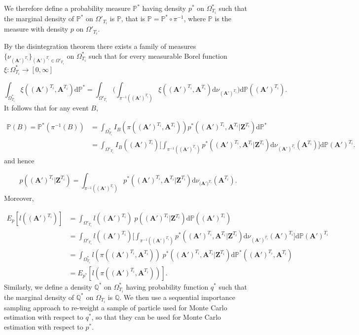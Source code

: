 \documentclass{article}
\newcommand{\D}{\mathrm{d}}
\renewcommand{\vec}[1]{\mathbf{#1}}
\begin{document}
We therefore define a probability measure $\mathbb{P}^*$ having density $p^*$ on $\Omega^*_{T_i}$ such that the marginal density of $\mathbb{P}^*$ on $\Omega'_{T_i}$ is $\mathbb{P}$, that is $\mathbb{P} = \mathbb{P}^* \circ \pi^{-1}$, where $\mathbb{P}$ is the measure with density $p$ on $\Omega'_{T_i}$.

By the disintegration theorem there exists a family of measures $\{ \nu_{(\vec{A}')^{T_i}}\}_{(\vec{A}')^{T_i} \in \Omega'_{T_i}}$ on $\Omega^*_{T_i}$ such that for every measurable Borel function $ \xi : \Omega^*_{T_i} \rightarrow [0, \infty]$

\begin{equation*}
    \int_{\Omega^*_{T_i}} \xi((\vec{A}')^{T_i}, \vec{A}^{T_i}) \D \mathbb{P}^* = \int_{\Omega'_{T_i}} \Bigg( \int_{\pi^{-1}((\vec{A}')^{T_i})} \xi((\vec{A}')^{T_i}, \vec{A}^{T_i}) \D \nu_{(\vec{A}')^{T_i}}  \Bigg) \D \mathbb{P}((\vec{A}')^{T_i}).
\end{equation*}
It follows that for any event $B$,

\begin{align*}
    \mathbb{P}(B) = \mathbb{P}^*(\pi^{-1}(B)) &= \int_{\Omega^*_{T_i}} I_B (\pi((\vec{A}')^{T_i}, \vec{A}^{T_i})) p^* ((\vec{A}')^{T_i}, \vec{A}^{T_i} | \vec{Z}^{T_i}) \D \mathbb{P}^* \\ 
    &= \int_{\Omega'_{T_i}} I_B ((\vec{A}')^{T_i}) \Bigg[ \int_{\pi^{-1}((\vec{A}')^{T_i})} p^* ((\vec{A}')^{T_i}, \vec{A}^{T_i} | \vec{Z}^{T_i}) \D \nu_{(\vec{A}')^{T_i}} (\vec{A}^{T_i}) \Bigg] \D \mathbb{P} (\vec{A}')^{T_i}.
\end{align*}
and hence

\begin{equation*}
    p((\vec{A}')^{T_i} | \vec{Z}^{T_i}) = \int_{\pi^{-1}((\vec{A}')^{T_i})} p^*((\vec{A}')^{T_i}, \vec{\vec{A}}^{T_i} | \vec{Z}^{T_i})\D \nu_{(\vec{A')}^{T_i}} (\vec{A}^{T_i}).
\end{equation*}
Moreover,

\begin{align*}
    E_{p}[l(\vec{(A')}^{T_i})]  &= \int_{\Omega'_{T_i}} l(\vec{(A')}^{T_i})\; p(\vec{(A')}^{T_i} | \vec{Z}^{T_i}) \D \mathbb{P}(\vec{(A')}^{T_i}) \\
    &= \int_{\Omega'_{T_i}} l(\vec{(A')}^{T_i})\Bigg[\int_{\pi^{-1}((\vec{A}')^{T_i})} p^*(\vec{(A')}^{T_i}, \vec{A}^{T_i} | \vec{Z}^{T_i}) \D \nu_{(\vec{A}')^{T_i}}(\vec{A}')^{T_i} \Bigg] \D \mathbb{P}{(\vec{A}')}^{T_i} \\ 
    &= \int_{\Omega^*_{T_i}} l(\pi(\vec{(A')}^{T_i}, \vec{A}^{T_i}))\; p^*(\vec{(A')}^{T_i}, \vec{A}^{T_i} | \vec{Z}^{T_i}) \D \mathbb{P}^*((\vec{A}')^{T_i}, \vec{A}^{T_i}) \\ 
    &= E_{p^*}[l(\pi (\vec{(A')}^{T_i}, \vec{A}^{T_i}))].
\end{align*}
Similarly, we define a density $\mathbb{Q}^*$ on $\Omega^*_{T_i}$ having probability function $q^*$ such that the marginal density of $\mathbb{Q}^*$ on $\Omega_{T_i}$ is $\mathbb{Q}$. We then use a sequential importance sampling approach to re-weight a sample of particle used for Monte Carlo estimation with respect to $q^*$, so that they can be used for Monte Carlo estimation with respect to $p^*$.
\end{document}
